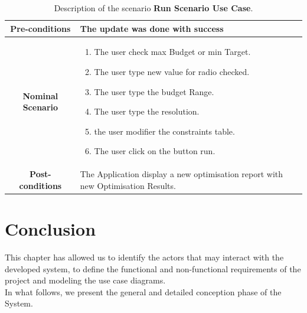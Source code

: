 	\begin{table}
			\caption{Description of the scenario \textbf{Run Scenario Use Case}.}
		\label{DSTabRS}
		\centering
		\begin{tabular}{|c|p{10cm}|}
			\hline 	
			\textbf{Pre-conditions } & The update was done with success \\ 
			\hline                     
			\textbf{Nominal Scenario } & \begin{enumerate}
				\item The user check max Budget or min Target.
				\item The user type new value for radio checked.
				\item The user type the budget Range.
				\item The user type the resolution.
				\item the user modifier the constraints table.
				\item The user click on the button run. 
			\end{enumerate} \\ 
			\hline 
			\textbf{Post-conditions} & The Application display a new optimisation report with new Optimisation Results. \\
			\hline 
		\end{tabular}
	\end{table}
	\clearpage
	\newpage
	
	\section{Conclusion}
	This chapter has allowed us to identify the actors that may interact with the developed system, to define the functional and non-functional requirements of the project and modeling the use case diagrams.
	\\
	In what follows, we present the general and detailed conception phase of the System.  
	

